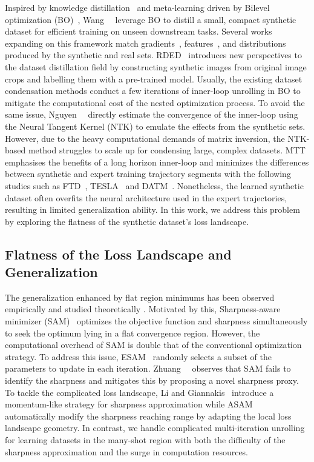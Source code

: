 Inspired by knowledge distillation~\citep{gou2021knowledge,yang2020distilling} and meta-learning driven by Bilevel optimization (BO)~\citep{lorraine2020optimizing, maclaurin2015gradient, mackay2019self, finn2017model, gao2022loss, rajeswaran2019meta, gao2021searching}, Wang~\etal~\citep{wang2018dataset} leverage BO to distill a small, compact synthetic dataset for efficient training on unseen downstream tasks. Several works expanding on this framework match gradients~\citep{dsa2021, dc2021,lee2022dataset}, features~\citep{wang2022cafe}, and distributions~\citep{dm} produced by the synthetic and real sets. RDED~\citep{rded} introduces new perspectives to the dataset distillation field by constructing synthetic images from original image crops and labelling them with a pre-trained model. Usually, the existing dataset condensation methods conduct a few iterations of inner-loop unrolling in BO to mitigate the computational cost of the nested optimization process. To avoid the same issue, Nguyen~\etal~\citep{nguyen2021dataset, nguyen2022dataset} directly estimate the convergence of the inner-loop using the Neural Tangent Kernel (NTK) to emulate the effects from the synthetic sets. However, due to the heavy computational demands of matrix inversion, the NTK-based method struggles to scale up for condensing large, complex datasets. MTT~\citep{mtt} emphasises the benefits of a long horizon inner-loop and minimizes the differences between synthetic and expert training trajectory segments with the following studies such as FTD~\citep{ftd}, TESLA~\citep{TESLA} and DATM~\citep{datm}. Nonetheless, the learned synthetic dataset often overfits the neural architecture used in the expert trajectories, resulting in limited generalization ability. In this work, we address this problem by exploring the flatness of the synthetic dataset's loss landscape.

\subsection{Flatness of the Loss Landscape and Generalization} The generalization enhanced by flat region minimums has been observed empirically and studied theoretically \citep{dinh2017sharp, keskar2016large,neyshabur2017exploring}. Motivated by this, Sharpness-aware minimizer (SAM)~\citep{sam} optimizes the objective function and sharpness simultaneously to seek the optimum lying in a flat convergence region. However, the computational overhead of SAM is double that of the conventional optimization strategy. To address this issue, ESAM~\citep{esam} randomly selects a subset of the parameters to update in each iteration. Zhuang~\etal~\citep{gsam} observes that SAM fails to identify the sharpness and mitigates this by proposing a novel sharpness proxy. To tackle the complicated loss landscape, Li and Giannakis~\citep{vasso} introduce a momentum-like strategy for sharpness approximation while ASAM~\citep{asam} automatically modify the sharpness reaching range by adapting the local loss landscape geometry. In contrast, we handle complicated multi-iteration unrolling for learning datasets in the many-shot region with both the difficulty of the sharpness approximation and the surge in computation resources.

